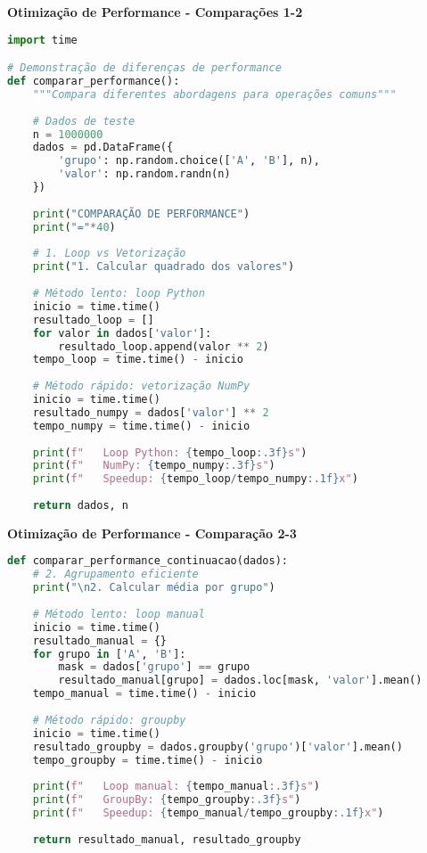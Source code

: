 \begin{examplebox}
\textbf{Otimização de Performance - Comparações 1-2}

\begin{lstlisting}[language=Python]
import time

# Demonstração de diferenças de performance
def comparar_performance():
    """Compara diferentes abordagens para operações comuns"""
    
    # Dados de teste
    n = 1000000
    dados = pd.DataFrame({
        'grupo': np.random.choice(['A', 'B'], n),
        'valor': np.random.randn(n)
    })
    
    print("COMPARAÇÃO DE PERFORMANCE")
    print("="*40)
    
    # 1. Loop vs Vetorização
    print("1. Calcular quadrado dos valores")
    
    # Método lento: loop Python
    inicio = time.time()
    resultado_loop = []
    for valor in dados['valor']:
        resultado_loop.append(valor ** 2)
    tempo_loop = time.time() - inicio
    
    # Método rápido: vetorização NumPy
    inicio = time.time()
    resultado_numpy = dados['valor'] ** 2
    tempo_numpy = time.time() - inicio
    
    print(f"   Loop Python: {tempo_loop:.3f}s")
    print(f"   NumPy: {tempo_numpy:.3f}s")
    print(f"   Speedup: {tempo_loop/tempo_numpy:.1f}x")
    
    return dados, n
\end{lstlisting}
\end{examplebox}

\begin{examplebox}
\textbf{Otimização de Performance - Comparação 2-3}

\begin{lstlisting}[language=Python]
def comparar_performance_continuacao(dados):
    # 2. Agrupamento eficiente
    print("\n2. Calcular média por grupo")
    
    # Método lento: loop manual
    inicio = time.time()
    resultado_manual = {}
    for grupo in ['A', 'B']:
        mask = dados['grupo'] == grupo
        resultado_manual[grupo] = dados.loc[mask, 'valor'].mean()
    tempo_manual = time.time() - inicio
    
    # Método rápido: groupby
    inicio = time.time()
    resultado_groupby = dados.groupby('grupo')['valor'].mean()
    tempo_groupby = time.time() - inicio
    
    print(f"   Loop manual: {tempo_manual:.3f}s")
    print(f"   GroupBy: {tempo_groupby:.3f}s")
    print(f"   Speedup: {tempo_manual/tempo_groupby:.1f}x")
    
    return resultado_manual, resultado_groupby
\end{lstlisting}
\end{examplebox}

